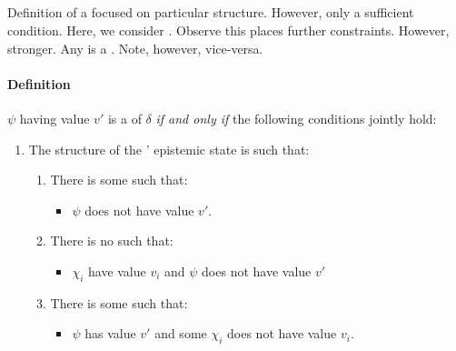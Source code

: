 \subsection{}
\label{sec:prequ3}

\begin{note}
  Definition of a \requ{} focused on particular structure.
  However, only a sufficient condition.
  Here, we consider \prequ{}.
  Observe this places further constraints.
  However, stronger.
  Any \prequ{} is a \crequ{}.
  Note, however, vice-versa.
\end{note}

\paragraph{Definition}

\begin{definition}
  \label{def:requ:prequ}
  \(\psi\) having value \(v'\) is a \emph{\prequ{}} of \(\delta\) \emph{if and only if} the following conditions jointly hold:
  \begin{enumerate}[label=\arabic*., ref=\named{P\(\Re\):\arabic*}]
  \item
    \label{def:requ:prequ:strcture}
    The structure of the \vAgent{}' epistemic state is such that:
    \begin{enumerate}[label=\alph*., ref=\named{P\(\Re\):1\alph*}]
    \item
      \label{def:requ:prequ:strcture:psi-not-v}
      There is some \epVW{} such that:
      \begin{itemize}
      \item
        \(\psi\) does not have value \(v'\).
      \end{itemize}
    \item
      \label{def:requ:prequ:strcture:chi-subset-psi}
      There is no \epVW{} such that:
      \begin{itemize}
      \item
        \(\chi_{i}\) have value \(v_{i}\) and \(\psi\) does not have value \(v'\)
      \end{itemize}
    \item
      \label{def:requ:prequ:strcture:chi-propersubset-psi}
      There is some \epVW{} such that:
      \begin{itemize}
      \item
        \(\psi\) has value \(v'\) and some \(\chi_{i}\) does not have value \(v_{i}\).
      \end{itemize}

\end{enumerate}
\end{enumerate}
\end{definition}

